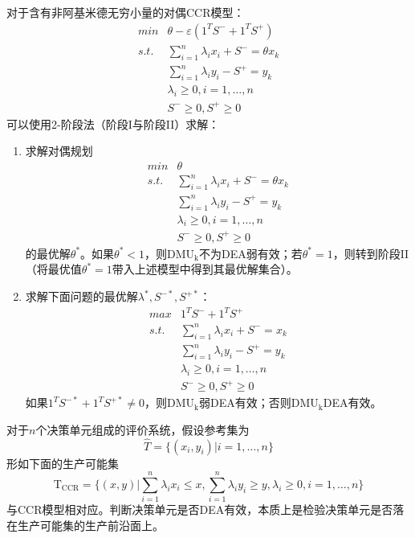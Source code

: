对于含有非阿基米德无穷小量的对偶CCR模型：
\begin{equation}\label{eq:dualeccr}
\begin{array}{ll}
  \textit{min} & \theta - \varepsilon(1^T S^{-} + 1^T S^{+}) \\
  \textit{s.t.} & \sum\limits_{i = 1}^n \lambda_i x_i + S^{-} = \theta x_k\\
   & \sum\limits_{i = 1}^n \lambda_i y_i - S^{+} = y_k\\
   & \lambda_i \ge 0, i = 1, \ldots, n\\
   & S^{-} \ge 0, S^{+}\ge 0
\end{array}
\end{equation}
可以使用2-阶段法（阶段I与阶段II）求解：
\begin{enumerate}[（I）]
  \item 求解对偶规划
\begin{equation}
\begin{array}{ll}
  \textit{min} & \theta\\
  \textit{s.t.} & \sum\limits_{i = 1}^n \lambda_i x_i + S^{-} = \theta x_k \\
   & \sum\limits_{i = 1}^n \lambda_i y_i - S^{+} = y_k\\
   & \lambda_i \ge 0, i = 1, \ldots, n\\
   & S^{-} \ge 0, S^{+}\ge 0
\end{array}
\end{equation}
    的最优解$\theta^{*}$。如果$\theta^{*} < 1$，则$\mathrm{DMU_k}$不为DEA弱有效；若$\theta^{*} = 1$，则转到阶段II（将最优值$\theta^{*} = 1$带入上述模型中得到其最优解集合）。
  \item 求解下面问题的最优解$\lambda^{*}, S^{-*},S^{+*}$：
\begin{equation}
\begin{array}{ll}
  \textit{max} & 1^T S^{-} + 1^T S^{+} \\
  \textit{s.t.} & \sum\limits_{i = 1}^n \lambda_i x_i + S^{-} = x_k\\
   & \sum\limits_{i = 1}^n \lambda_i y_i - S^{+} = y_k\\
   & \lambda_i \ge 0, i = 1, \ldots, n\\
   & S^{-} \ge 0, S^{+}\ge 0
\end{array}
\end{equation}
如果$1^T S^{-*} + 1^T S^{+*} \ne 0$，则$\mathrm{DMU_k}$弱DEA有效；否则$\mathrm{DMU_k}$DEA有效。
\end{enumerate}

对于$n$个决策单元组成的评价系统，假设参考集为
\begin{equation}
  \hat{T} = \{(x_i, y_i) | i = 1,\ldots, n\}
\end{equation}
形如下面的生产可能集
\begin{equation}
  \mathrm{T_{CCR}} = \{(x,y) | \sum\limits_{i = 1}^n \lambda_i x_i \le x, \sum\limits_{i = 1}^n \lambda_i y_i \ge y, \lambda_i \ge 0, i = 1,\ldots, n\}
\end{equation}
与CCR模型相对应。判断决策单元是否DEA有效，本质上是检验决策单元是否落在生产可能集的生产前沿面上。

